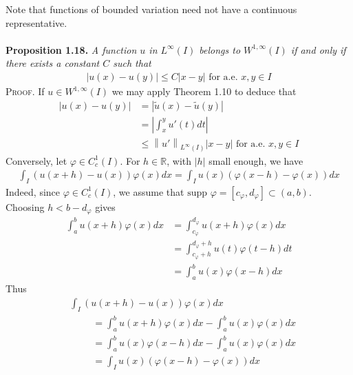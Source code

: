 \documentclass[a4paper,oneside]{book}
\numberwithin{equation}{chapter}
\begin{document}
Note that functions of bounded variation need not have a continuous representative.\\
\\
\textbf{Proposition 1.18.} \textit{A function $u$ in $L^\infty \left(I\right)$ belongs to $W^{1,\infty}\left(I\right)$ if and only if there exists a constant $C$ such that}
\begin{align}
\label{1.101}
\left| {u\left( x \right) - u\left( y \right)} \right| \le C\left| {x - y} \right|\mbox{ for a.e. }x,y \in I
\end{align}
\textsc{Proof.} If $u \in {W^{1,\infty }}\left( I \right)$ we may apply Theorem 1.10 to deduce that
\begin{align}
\left| {u\left( x \right) - u\left( y \right)} \right| &= \left| {\tilde u\left( x \right) - \tilde u\left( y \right)} \right|\\
 &= \left| {\int_x^y {u'\left( t \right)dt} } \right|\\
 &\le {\left\| {u'} \right\|_{{L^\infty }\left( I \right)}}\left| {x - y} \right|\mbox{ for a.e. }x,y \in I
\end{align}
Conversely, let $\varphi  \in C_c^1\left( I \right)$. For $h\in \mathbb{R}$, with $\left| h \right|$ small enough, we have
\begin{align}
\int_I {\left( {u\left( {x + h} \right) - u\left( x \right)} \right)\varphi \left( x \right)dx}  = \int_I {u\left( x \right)\left( {\varphi \left( {x - h} \right) - \varphi \left( x \right)} \right)dx} 
\end{align}
Indeed, since $\varphi  \in C_c^1\left( I \right)$, we assume that $\mbox{supp }\varphi  = \left[ {c_\varphi,d_\varphi} \right] \subset \left( {a,b} \right)$. Choosing $h < b - {d_\varphi }$ gives
\begin{align}
\int_a^b {u\left( {x + h} \right)\varphi \left( x \right)dx}  &= \int_{{c_\varphi }}^{{d_\varphi }} {u\left( {x + h} \right)\varphi \left( x \right)dx} \\
 &= \int_{{c_\varphi } + h}^{{d_\varphi } + h} {u\left( t \right)\varphi \left( {t - h} \right)dt} \\
 &= \int_a^b {u\left( x \right)\varphi \left( {x - h} \right)dx} 
\end{align}
Thus
\begin{align}
&\int_I {\left( {u\left( {x + h} \right) - u\left( x \right)} \right)\varphi \left( x \right)dx} \\
& \hspace{1cm}= \int_a^b {u\left( {x + h} \right)\varphi \left( x \right)dx}  - \int_a^b {u\left( x \right)\varphi \left( x \right)dx} \\
& \hspace{1cm} = \int_a^b {u\left( x \right)\varphi \left( {x - h} \right)dx}  - \int_a^b {u\left( x \right)\varphi \left( x \right)dx} \\
& \hspace{1cm} = \int_I {u\left( x \right)\left( {\varphi \left( {x - h} \right) - \varphi \left( x \right)} \right)dx} 
\end{align}
\end{document}

